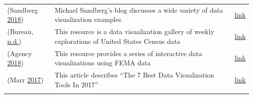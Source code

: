 \documentclass[]{book}
\begin{document}
\begin{longtable}[]{@{}lll@{}}
\begin{minipage}[t]{0.15\columnwidth}
(Sandberg \protect\hyperlink{ref-sandberg_blog}{2018})\strut
\end{minipage} & \begin{minipage}[t]{0.28\columnwidth}\raggedright
Michael Sandberg's blog discusses a wide variety of data visualization examples\strut
\end{minipage} & \begin{minipage}[t]{0.48\columnwidth}\raggedright
\href{https://datavizblog.com}{link}\strut
\end{minipage}\tabularnewline
\begin{minipage}[t]{0.15\columnwidth}\raggedright
(Bureau, \protect\hyperlink{ref-census_viz}{n.d.})\strut
\end{minipage} & \begin{minipage}[t]{0.28\columnwidth}\raggedright
This resource is a data visualization gallery of weekly explorations of United States Census data\strut
\end{minipage} & \begin{minipage}[t]{0.48\columnwidth}\raggedright
\href{https://www.census.gov/dataviz/}{link}\strut
\end{minipage}\tabularnewline
\begin{minipage}[t]{0.15\columnwidth}\raggedright
(Agency \protect\hyperlink{ref-fema_viz}{2018})\strut
\end{minipage} & \begin{minipage}[t]{0.28\columnwidth}\raggedright
This resource provides a series of interactive data visualizations using FEMA data\strut
\end{minipage} & \begin{minipage}[t]{0.48\columnwidth}\raggedright
\href{https://www.fema.gov/data-visualization}{link}\strut
\end{minipage}\tabularnewline
\begin{minipage}[t]{0.15\columnwidth}\raggedright
(Marr \protect\hyperlink{ref-7_best_tools}{2017})\strut
\end{minipage} & \begin{minipage}[t]{0.28\columnwidth}\raggedright
This article describes ``The 7 Best Data Visualization Tools In 2017''\strut
\end{minipage} & \begin{minipage}[t]{0.48\columnwidth}\raggedright
\href{https://www.forbes.com/sites/bernardmarr/2017/07/20/the-7-best-data-visualization-tools-in-2017/\#3a12b8ea6c30}{link}\strut
\end{minipage}\tabularnewline
\begin{minipage}[t]{0.15\columnwidth}\raggedright

\end{minipage}
\end{longtable}
\end{document}
